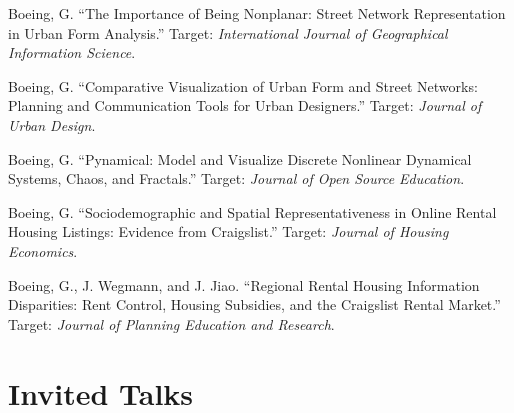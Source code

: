 \documentclass{academiccv}
\begin{document}
\begin{tablist}
	
\item[\the\year] \tab Boeing, G. \enquote{The Importance of Being Nonplanar: Street Network Representation in Urban Form Analysis.} Target: \emph{International Journal of Geographical Information Science}.

\item[\the\year] \tab Boeing, G. \enquote{Comparative Visualization of Urban Form and Street Networks: Planning and Communication Tools for Urban Designers.} Target: \emph{Journal of Urban Design}.

\item[\the\year] \tab Boeing, G. \enquote{Pynamical: Model and Visualize Discrete Nonlinear Dynamical Systems, Chaos, and Fractals.} Target: \emph{Journal of Open Source Education}.

\item[\the\year] \tab Boeing, G. \enquote{Sociodemographic and Spatial Representativeness in Online Rental Housing Listings: Evidence from Craigslist.} Target: \emph{Journal of Housing Economics}.

\item[\the\year] \tab Boeing, G., J. Wegmann, and J. Jiao. \enquote{Regional Rental Housing Information Disparities: Rent Control, Housing Subsidies, and the Craigslist Rental Market.} Target: \emph{Journal of Planning Education and Research}.
	
\end{tablist}



\section*{Invited Talks}
\end{document}
